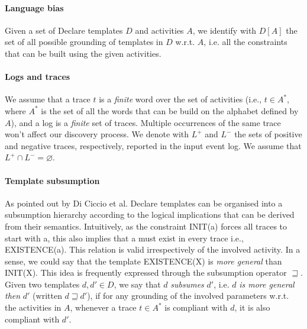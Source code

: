 

\paragraph{Language bias} Given a set of Declare templates $D$ and activities $A$, we identify with $D[A]$ the set of all possible grounding of templates in $D$ w.r.t. $A$, i.e. all the constraints that can be built using the given activities.

\paragraph{Logs and traces} We assume that a trace $t$ is a \emph{finite} word over the set of activities (i.e., $t\in A^*$, where $A^*$ is the set of all the words that can be build on the alphabet defined by $A$), and a log is a \emph{finite} set of traces. Multiple occurrences of the same trace won't affect our discovery process. We denote with $L^+$ and $L^-$ the sets of positive and negative traces, respectively, reported in the input event log. We assume that $L^+ \cap L^- = \varnothing$.

\paragraph{Template subsumption} As pointed out by Di Ciccio et al. \cite{2017-DiCiccio} Declare templates can be organised into a subsumption hierarchy according to the logical implications that can be derived from their semantics. Intuitively, as the constraint \textsf{INIT(a)} forces all traces to start with \textsf{a}, this also implies that \textsf{a} must exist in every trace i.e., \textsf{EXISTENCE(a)}. This relation is valid irrespectively of the involved activity. In a sense, we could say that the template \textsf{EXISTENCE(X)} is \emph{more general} than \textsf{INIT(X)}.
This idea is frequently expressed through the subsumption operator $\sqsupseteq$. Given two templates $d, d' \in D$, we say that $d$ \emph{subsumes} $d'$, i.e. $d$ \emph{is more general then} $d'$ (written $d\sqsupseteq d'$), if for any grounding of the involved parameters w.r.t. the activities in $A$, whenever a trace $t \in A^*$ is compliant with $d$, it is also compliant with $d'$.



